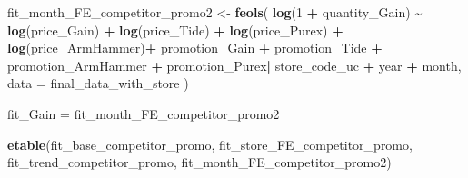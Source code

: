 \documentclass[
]{article}
\newenvironment{Shaded}{\begin{snugshade}}{\end{snugshade}}
\newcommand{\AttributeTok}[1]{\textcolor[rgb]{0.13,0.29,0.53}{#1}}
\newcommand{\DecValTok}[1]{\textcolor[rgb]{0.00,0.00,0.81}{#1}}
\newcommand{\FunctionTok}[1]{\textcolor[rgb]{0.13,0.29,0.53}{\textbf{#1}}}
\newcommand{\NormalTok}[1]{#1}
\newcommand{\OtherTok}[1]{\textcolor[rgb]{0.56,0.35,0.01}{#1}}
\newcommand{\SpecialCharTok}[1]{\textcolor[rgb]{0.81,0.36,0.00}{\textbf{#1}}}
\begin{document}
\begin{Shaded}
\begin{Highlighting}[]
\NormalTok{fit\_month\_FE\_competitor\_promo2 }\OtherTok{\textless{}{-}} \FunctionTok{feols}\NormalTok{(}
  \FunctionTok{log}\NormalTok{(}\DecValTok{1} \SpecialCharTok{+}\NormalTok{ quantity\_Gain) }\SpecialCharTok{\textasciitilde{}} \FunctionTok{log}\NormalTok{(price\_Gain) }\SpecialCharTok{+} \FunctionTok{log}\NormalTok{(price\_Tide) }\SpecialCharTok{+} \FunctionTok{log}\NormalTok{(price\_Purex)}
  \SpecialCharTok{+} \FunctionTok{log}\NormalTok{(price\_ArmHammer)}\SpecialCharTok{+}\NormalTok{ promotion\_Gain }\SpecialCharTok{+}\NormalTok{ promotion\_Tide }\SpecialCharTok{+}\NormalTok{ promotion\_ArmHammer}
  \SpecialCharTok{+}\NormalTok{ promotion\_Purex}\SpecialCharTok{|}\NormalTok{ store\_code\_uc }\SpecialCharTok{+}\NormalTok{ year }\SpecialCharTok{+}\NormalTok{ month,}
  \AttributeTok{data =}\NormalTok{ final\_data\_with\_store}
\NormalTok{)}

\NormalTok{fit\_Gain }\OtherTok{=}\NormalTok{ fit\_month\_FE\_competitor\_promo2}

\FunctionTok{etable}\NormalTok{(fit\_base\_competitor\_promo, fit\_store\_FE\_competitor\_promo, }
\NormalTok{       fit\_trend\_competitor\_promo, fit\_month\_FE\_competitor\_promo2)}
\end{Highlighting}
\end{Shaded}
\end{document}
